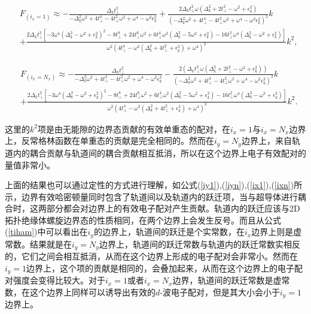 \begin{small}
\begin{equation}
\begin{aligned}
&F_{(i_x=1)}\approx-\frac{\Delta_k  t_\perp^2}{-\Delta_k ^2 \omega ^2+4 t_\perp^4-4 t_\perp^2 \omega ^2+\omega ^4-\omega ^2 \epsilon_k ^2}+\frac{2 \Delta_k   t_\perp^2 \omega  \left(\Delta_k ^2+2 t_\perp^2-\omega ^2+\epsilon_k ^2\right)}{\left(-\Delta_k ^2 \omega ^2+4 t_\perp^4-4 t_\perp^2 \omega ^2+\omega ^4-\omega ^2 \epsilon_k ^2\right)^2}k\\
&+\frac{2 \Delta_k   t_\perp^2 \left[-3 \omega ^4 \left(\Delta_k ^2-\omega ^2+\epsilon_k ^2\right)^2-8 t_\perp^8+24 t_\perp^6 \omega ^2+6 t_\perp^4 \omega ^2 \left(\Delta_k ^2-5 \omega ^2+\epsilon_k ^2\right)-16 t_\perp^2 \omega ^4 \left(\Delta_k ^2-\omega ^2+\epsilon_k ^2\right)\right]}{\omega ^2 \left(4 t_\perp^4-\omega ^2 \left(\Delta_k ^2+4 t_\perp^2+\epsilon_k ^2\right)+\omega ^4\right)^3}k^2,
\end{aligned}
\end{equation}
\end{small}
\begin{small}
\begin{equation}
\begin{aligned}
&F_{(i_x=N_x)}\approx-\frac{\Delta_k  t_\perp^2}{-\Delta_k ^2 \omega ^2+4 t_\perp^4-4 t_\perp^2 \omega ^2+\omega ^4-\omega ^2 \epsilon_k ^2}-\frac{2  \left(\Delta_k  t_\perp^2 \omega  \left(\Delta_k ^2+2 t_\perp^2-\omega ^2+\epsilon_k ^2\right)\right)}{\left(-\Delta_k ^2 \omega ^2+4 t_\perp^4-4 t_\perp^2 \omega ^2+\omega ^4-\omega ^2 \epsilon_k ^2\right)^2}k\\
&+\frac{2 \Delta_k   t_\perp^2 \left[-3 \omega ^4 \left(\Delta_k ^2-\omega ^2+\epsilon_k ^2\right)^2-8 t_\perp^8+24 t_\perp^6 \omega ^2+6 t_\perp^4 \omega ^2 \left(\Delta_k ^2-5 \omega ^2+\epsilon_k ^2\right)-16 t_\perp^2 \omega ^4 \left(\Delta_k ^2-\omega ^2+\epsilon_k ^2\right)\right]}{\omega ^2 \left(4 t_\perp^4-\omega ^2 \left(\Delta_k ^2+4 t_\perp^2+\epsilon_k ^2\right)+\omega ^4\right)^3}k^2.
\end{aligned}
\end{equation}
\end{small}
这里的$k^2$项是由无能隙的边界态贡献的有效单重态的配对，在$i_x=1$与$i_x=N_x$边界上，反常格林函数在单重态的贡献是完全相同的。然而在$i_y=N_y$边界上，来自轨道内的耦合贡献与轨道间的耦合贡献相互抵消，所以在这个边界上电子有效配对的量值非常小。

上面的结果也可以通过定性的方式进行理解，如公式(\ref{iy1}),(\ref{iyn}),(\ref{ix1}),(\ref{ixn})所示，边界有效哈密顿量同时包含了轨道间以及轨道内的跃迁项，当与超导体进行耦合时，这两部分都会对边界上的有效电子配对产生贡献。轨道内的跃迁应该与2D拓扑绝缘体螺旋边界态的性质相同，在两个边界上会发生反号。而且从公式(\ref{tiham})中可以看出在$i_y$的边界上，轨道间的跃迁是个实常数，在$i_x$边界上则是虚常数。结果就是在$i_y=N_y$边界上，轨道间的跃迁常数与轨道内的跃迁常数实相反的，它们之间会相互抵消，从而在这个边界上形成的电子配对会非常小。然而在$i_y=1$边界上，这个项的贡献是相同的，会叠加起来，从而在这个边界上的电子配对强度会变得比较大。对于$i_x=1$或者$i_x=N_x$边界，轨道间的跃迁常数是虚常数，在这个边界上同样可以诱导出有效的$d$-波电子配对，但是其大小会小于$i_y=1$边界上。
